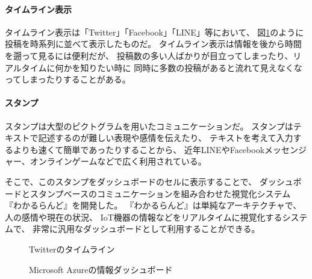 \vspace{2mm}
\paragraph*{タイムライン表示}

タイムライン表示は「Twitter」「Facebook」「LINE」等において、
図\ref{twitter}のように投稿を時系列に並べて表示したものだ。
タイムライン表示は情報を後から時間を遡って見るには便利だが、
投稿数の多い人ばかりが目立ってしまったり、リアルタイムに何かを知りたい時に
同時に多数の投稿があると流れて見えなくなってしまったりすることがある。

\vspace{1mm}
\paragraph*{スタンプ}

スタンプは大型のピクトグラムを用いたコミュニケーションだ。
スタンプはテキストで記述するのが難しい表現や感情を伝えたり、
テキストを考えて入力するよりも速くて簡単であったりすることから、
近年LINEやFacebookメッセンジャー、オンラインゲームなどで広く利用されている。

\vspace{3mm}
そこで、このスタンプをダッシュボードのセルに表示することで、
ダッシュボードとスタンプベースのコミュニケーションを組み合わせた視覚化システム
『わかるらんど』を開発した。
『わかるらんど』は単純なアーキテクチャで、人の感情や現在の状況、
IoT機器の情報などをリアルタイムに視覚化するシステムで、
非常に汎用なダッシュボードとして利用することができる。

\begin{figure}[h]
\centering
{}
\caption{Twitterのタイムライン}
\label{twitter}
\end{figure}


\begin{figure}[h]
\centering
{}
\caption{Microsoft Azureの情報ダッシュボード}
\label{azure}
\end{figure}
